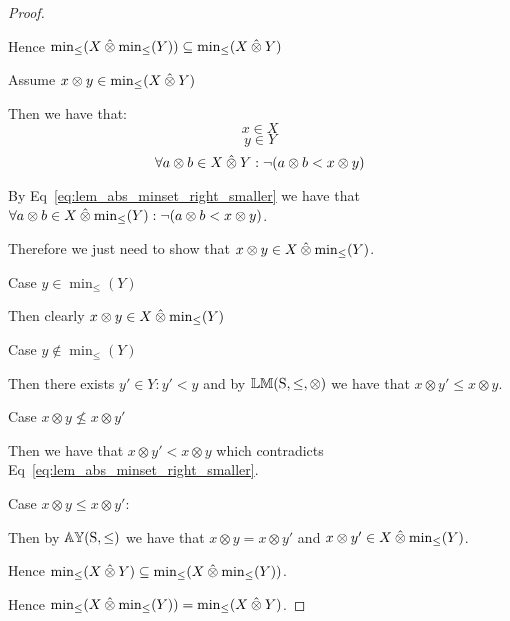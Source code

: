 \begin{proof}
\begin{ind}
\end{ind}
Hence $ \min_\leq(X \mathbin{\hat{\otimes}} \min_\leq(Y)) \subseteq \min_\leq(X \mathbin{\hat{\otimes}} Y)$

\vspace{2em}

Assume $x \otimes y \in \min_\leq(X \mathbin{\hat{\otimes}} Y)$
\begin{ind}
Then we have that:
\begin{equation}
x \in X
\end{equation}
\begin{equation}
y \in Y
\end{equation}
\begin{equation} \label{eq:lem_abs_minset_right_smaller}
\forall a \otimes b \in X \mathbin{\hat{\otimes}} Y : \neg (a \otimes b < x \otimes y)
\end{equation}

By Eq~\ref{eq:lem_abs_minset_right_smaller} we have that $\forall a \otimes b \in X \mathbin{\hat{\otimes}} \min_\leq(Y) : \neg (a \otimes b < x \otimes y)$.

\vspace{0.5em}

Therefore we just need to show that $x \otimes y \in X \mathbin{\hat{\otimes}} \min_\leq(Y)$.

\vspace{0.5em}

Case $y \in \min_\leq(Y)$
\begin{ind}
Then clearly $x \otimes y \in X \mathbin{\hat{\otimes}} \min_\leq(Y)$
\end{ind}

Case $y \notin \min_\leq(Y)$
\begin{ind}
Then there exists $y' \in Y : y' < y$ and by ${\mathbb{LM}}\mathrm{(S,\leq,\otimes)}$ we have that $x \otimes y' \leq x \otimes y$.

\vspace{0.5em}

Case $x \otimes y \nleq x \otimes y'$
\begin{ind}
Then we have that $x \otimes y' < x \otimes y$ which contradicts Eq~\ref{eq:lem_abs_minset_right_smaller}.
\end{ind}
Case $x \otimes y \leq x \otimes y'$:
\begin{ind}
Then by ${\mathbb{AY}}\mathrm{(S,\leq)}$ we have that $x \otimes y = x \otimes y'$ and $x \otimes y' \in X \mathbin{\hat{\otimes}} \min_\leq(Y)$.
\end{ind}
\end{ind}
\end{ind}
Hence $\min_\leq(X \mathbin{\hat{\otimes}} Y) \subseteq \min_\leq(X \mathbin{\hat{\otimes}} \min_\leq(Y))$.

\vspace{2em}

Hence $\min_\leq(X \mathbin{\hat{\otimes}} \min_\leq(Y)) = \min_\leq(X \mathbin{\hat{\otimes}} Y)$.
\end{proof}



